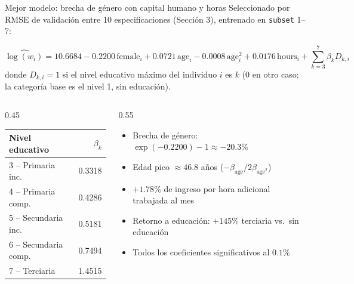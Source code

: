 
\begin{frame}{Mejor modelo: brecha de género con capital humano y horas}
    \footnotesize
    Seleccionado por RMSE de validación entre 10 especificaciones (Sección 3), entrenado en \texttt{subset} 1--7:

    \[
        \widehat{\log(w_i)} = 10.6684 - 0.2200\,\mathrm{female}_i + 0.0721\,\mathrm{age}_i
        - 0.0008\,\mathrm{age}_i^2 + 0.0176\,\mathrm{hours}_i
        + \sum_{k=3}^{7} \beta_k D_{k,i}
    \]
    donde $D_{k,i}=1$ si el nivel educativo máximo del individuo $i$ es $k$ (0 en otro caso; la categoría base es el nivel 1, sin educación).

    \vspace{0.3cm}
    \begin{columns}[T]
        \begin{column}{0.45\textwidth}
            \centering
            \begin{tabular}{lr}
                \toprule
                Nivel educativo & $\beta_k$ \\
                \midrule
                3 -- Primaria inc.    & 0.3318 \\
                4 -- Primaria comp.   & 0.4286 \\
                5 -- Secundaria inc.  & 0.5181 \\
                6 -- Secundaria comp. & 0.7494 \\
                7 -- Terciaria        & 1.4515 \\
                \bottomrule
            \end{tabular}
        \end{column}
        \begin{column}{0.55\textwidth}
            \begin{itemize}
                \item Brecha de género: $\exp(-0.2200)-1 \approx -20.3\%$
                \item Edad pico $\approx 46.8$ años ($-\beta_{\mathrm{age}}/2\beta_{\mathrm{age}^2}$)
                \item $+1.78\%$ de ingreso por hora adicional trabajada al mes
                \item Retorno a educación: $+145\%$ terciaria vs.\ sin educación
                \item Todos los coeficientes significativos al $0.1\%$
            \end{itemize}
        \end{column}
    \end{columns}
\end{frame}
